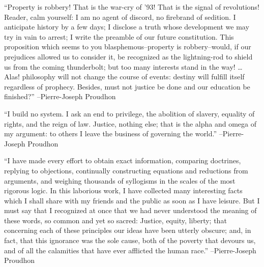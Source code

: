 \documentclass{article}%
\begin{document}
\linebreak%
\vspace{1mm}%
\begin{minipage}{\textwidth}%
\flushleft%
“Property is robbery! That is the war{-}cry of '93! That is the signal of revolutions! Reader, calm yourself: I am no agent of discord, no firebrand of sedition. I anticipate history by a few days; I disclose a truth whose development we may try in vain to arrest; I write the preamble of our future constitution. This proposition which seems to you blasphemous–property is robbery–would, if our prejudices allowed us to consider it, be recognized as the lightning{-}rod to shield us from the coming thunderbolt; but too many interests stand in the way! … Alas! philosophy will not change the course of events: destiny will fulfill itself regardless of prophecy. Besides, must not justice be done and our education be finished?”%
\linebreak%
\vspace{1mm}%
–Pierre{-}Joseph Proudhon%
\linebreak%
\vspace{1mm}%
\end{minipage}%
\linebreak%
\vspace{1mm}%
\begin{minipage}{\textwidth}%
\flushleft%
“I build no system. I ask an end to privilege, the abolition of slavery, equality of rights, and the reign of law. Justice, nothing else; that is the alpha and omega of my argument: to others I leave the business of governing the world.”%
\linebreak%
\vspace{1mm}%
–Pierre{-}Joseph Proudhon%
\linebreak%
\vspace{1mm}%
\end{minipage}%
\linebreak%
\vspace{1mm}%
\begin{minipage}{\textwidth}%
\flushleft%
“I have made every effort to obtain exact information, comparing doctrines, replying to objections, continually constructing equations and reductions from arguments, and weighing thousands of syllogisms in the scales of the most rigorous logic. In this laborious work, I have collected many interesting facts which I shall share with my friends and the public as soon as I have leisure. But I must say that I recognized at once that we had never understood the meaning of these words, so common and yet so sacred: Justice, equity, liberty; that concerning each of these principles our ideas have been utterly obscure; and, in fact, that this ignorance was the sole cause, both of the poverty that devours us, and of all the calamities that have ever afflicted the human race.”%
\linebreak%
\vspace{1mm}%
–Pierre{-}Joseph Proudhon%
\linebreak%
\vspace{1mm}%
\end{minipage}%
\end{document}

